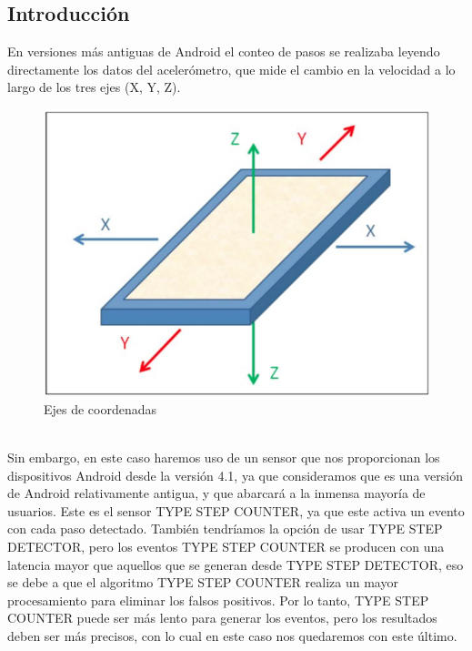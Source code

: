 \documentclass[12pt, a4paper, titlepage]{article}
\begin{document}
    	\subsection{Introducción}
    	En versiones más antiguas de Android el conteo de pasos se realizaba leyendo directamente los datos del acelerómetro, que mide el cambio en la velocidad a lo largo de los tres ejes (X, Y, Z).
    	\newline
    	\begin{figure}[h!]
    		\begin{center}
    			\includegraphics[scale=0.65]{img/ejes.png}
    			\caption{Ejes de coordenadas}
    		\end{center}
    	\end{figure}\\

    	Sin embargo, en este caso haremos uso de un sensor que nos proporcionan los dispositivos Android desde la versión 4.1, ya que consideramos que es una versión de Android relativamente antigua, y que abarcará a la inmensa mayoría de usuarios. Este es el sensor TYPE STEP COUNTER, ya que este activa un evento con cada paso detectado. También tendríamos la opción de usar TYPE STEP DETECTOR, pero los eventos TYPE STEP COUNTER se producen con una latencia mayor que aquellos que se generan desde TYPE STEP DETECTOR, eso se debe a que el algoritmo TYPE STEP COUNTER realiza un mayor procesamiento para eliminar los falsos positivos. Por lo tanto, TYPE STEP COUNTER puede ser más lento para generar los eventos, pero los resultados deben ser más precisos, con lo cual en este caso nos quedaremos con este último.
\end{document}
